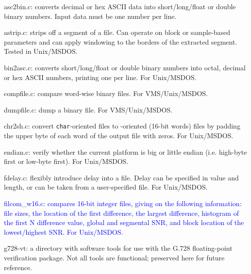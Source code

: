 \begin{Descr}{40mm}
\item[asc2bin.c:]
        converts decimal or hex ASCII data into short/long/float
                or double binary numbers. Input data must be one
                number per line.

\item[astrip.c:]
        strips off a segment of a file. Can operate on block or
                sample-based parameters and can apply windowing to the
                borders of the extracted segment. Tested in Unix/MSDOS.

\item[bin2asc.c:]
        converts short/long/float or double binary numbers into
                octal, decimal or hex ASCII numbers, printing one per
                line. For Unix/MSDOS.

\item[compfile.c:]
        compare word-wise binary files. For VMS/Unix/MSDOS.

\item[dumpfile.c:]
        dump a binary file. For VMS/Unix/MSDOS.

\item[chr2sh.c:]
           convert {\tt char}-oriented files to \short-oriented (16-bit
           words) files by padding the upper byte of each word of
           the output file with zeros. For Unix/MSDOS.

\item[endian.c:]
  verify whether the current platform is big or little endian
  (i.e. high-byte first or low-byte first). For Unix/MSDOS.

\item[fdelay.c:]
        flexibly introduce delay into a file. Delay
        can be specified in value and length, or can be taken
        from a user-specified file. For Unix/MSDOS.

\textcolor{blue}{%
\item[filcom\_w16.c:]
  compares 16-bit integer files, giving on the following information:
  file sizes, the location of the first difference, the largest
  difference, histogram of the first N difference value, global and
  segmental SNR, and block location of the lowest/highest SNR. For
  Unix/MSDOS.
%
}

\item[g728-vt:]
            a directory with software tools for use with the G.728
            floating-point verification package. Not all tools are
            functional; preserved here for future reference.


\end{Descr}
